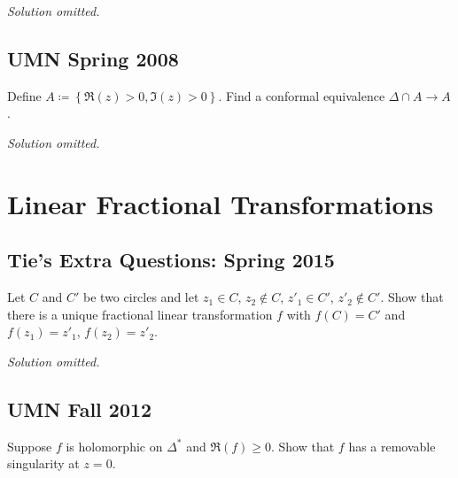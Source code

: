 \emph{Solution omitted.}

\hypertarget{umn-spring-2008}{%
\subsection{UMN Spring 2008}\label{umn-spring-2008}}

\begin{problem}[?]

Define \(A \coloneqq\left\{{\Re(z) > 0, \Im(z) > 0}\right\}\). Find a
conformal equivalence \(\Delta \cap A \to A\).

\end{problem}

\emph{Solution omitted.}

\hypertarget{linear-fractional-transformations}{%
\section{Linear Fractional
Transformations}\label{linear-fractional-transformations}}

\hypertarget{ties-extra-questions-spring-2015-6}{%
\subsection{Tie's Extra Questions: Spring
2015}\label{ties-extra-questions-spring-2015-6}}

\begin{problem}[?]

Let \(C\) and \(C'\) be two circles and let \(z_1 \in C\),
\(z_2 \notin C\), \(z'_1 \in C'\), \(z'_2 \notin C'\). Show that there
is a unique fractional linear transformation \(f\) with \(f(C) = C'\)
and \(f(z_1) = z'_1\), \(f(z_2) = z'_2\).

\end{problem}

\emph{Solution omitted.}

\hypertarget{umn-fall-2012}{%
\subsection{UMN Fall 2012}\label{umn-fall-2012}}

\begin{problem}[?]

Suppose \(f\) is holomorphic on \(\Delta^*\) and \(\Re(f) \geq 0\). Show
that \(f\) has a removable singularity at \(z=0\).

\end{problem}

